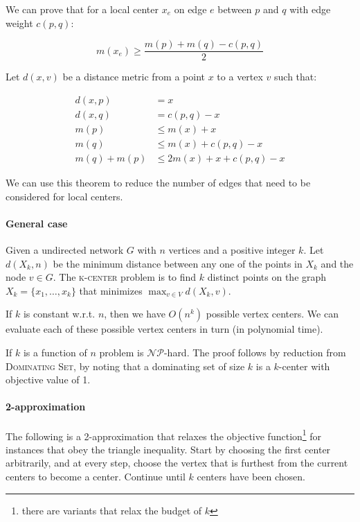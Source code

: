 \documentclass{idc_msc}
\newcommand{\NPclass}{\mathcal{NP}}
\begin{document}
We can prove that for a local center \(x_e\) on edge \(e\) between \(p\) and \(q\) with edge weight \(c(p,q)\):

\[m(x_e) \ge \frac{m(p) + m(q) - c(p,q)}{2}\]

Let \(d(x,v)\) be a distance metric from a point \(x\) to a vertex \(v\) such that:

\[
\begin{aligned}
d(x,p) &= x \\
d(x,q) &= c(p,q) - x \\
m(p) &\le m(x) + x \\
m(q) &\le m(x) + c(p,q) - x \\
m(q) + m(p) &\le 2 m(x) + x + c(p,q) - x
\end{aligned}
\]

We can use this theorem to reduce the number of edges that need to be considered for local centers.

\paragraph{General case}

Given a undirected network \(G\) with \(n\) vertices and a positive integer \(k\).
Let \(d(X_k, n)\) be the minimum distance between any one of the points in \(X_k\) and the node \(v \in G\).
The \textsc{k-center} problem is to find \(k\) distinct points on the graph \(X_k=\{x_1,\ldots,x_k\}\) that minimizes \(\max_{v\in V} d(X_k, v)\).

If \(k\) is constant w.r.t. \(n\), then we have \(O(n^k)\) possible vertex centers.
We can evaluate each of these possible vertex centers in turn (in polynomial time).

If \(k\) is a function of \(n\) problem is \(\NPclass\)-hard.
The proof follows by reduction from \textsc{Dominating Set}, by noting that a dominating set of size \(k\) is a \(k\)-center with objective value of 1.

\paragraph{2-approximation}

The following is a 2-approximation that relaxes the objective function\footnote{there are variants that relax the budget of \(k\)} for instances that obey the triangle inequality.
Start by choosing the first center arbitrarily, and at every step, choose the vertex that is furthest from the current centers to become a center.
Continue until \(k\) centers have been chosen.
\end{document}
